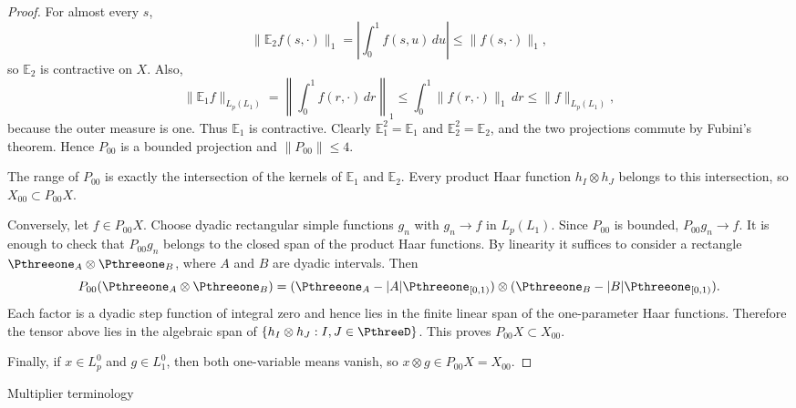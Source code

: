 \documentclass[11pt,reqno]{amsart}
\makeatletter
\theoremstyle{plain}
\theoremstyle{definition}
\newcounter{problempaper}
\newenvironment{problempaperbody}{%
  \setcounter{subsection}{0}%
  \setcounter{subsubsection}{0}%
  \setcounter{paragraph}{0}%
  \renewcommand{\thesubsection}{\arabic{subsection}}%
  \renewcommand{\thesubsubsection}{\thesubsection.\arabic{subsubsection}}%
  \renewcommand{\theparagraph}{\thesubsubsection.\arabic{paragraph}}%
  \let\problem@outersection\section
  \let\problem@outersubsection\subsection
  \let\problem@outersubsubsection\subsubsection
  \let\problem@outerparagraph\paragraph
  \let\section\problem@papersection
  \let\subsection\problem@papersubsection
  \let\subsubsection\problem@papersubsubsection
}{%
  \let\section\problem@outersection
  \let\subsection\problem@outersubsection
  \let\subsubsection\problem@outersubsubsection
  \let\paragraph\problem@outerparagraph
}
\newcommand{\problem@target}[2]{%
  \hypertarget{problem-\theproblempaper-#1-#2}{}%
}
\newcommand{\problem@paperheading}[3]{%
  \par\bigskip
  \problem@target{#1}{#2}%
  \noindent{\large\bfseries #2.\quad #3\par}%
  \nobreak\smallskip
}
\newcommand{\problem@papersubheading}[3]{%
  \par\medskip
  \problem@target{#1}{#2}%
  \noindent{\normalsize\bfseries #2.\quad #3\par}%
  \nobreak\smallskip
}
\newcommand{\problem@papersubsubheading}[3]{%
  \par\smallskip
  \problem@target{#1}{#2}%
  \noindent{\normalsize\itshape #2.\quad #3.\ }%
}
\def\problem@papersection{%
  \@ifstar{\problem@papersectionstar}{\problem@papersectionnostar}%
}
\def\problem@papersectionstar#1{%
  \par\bigskip\noindent{\large\bfseries #1\par}\nobreak\smallskip
}
\def\problem@papersectionnostar#1{%
  \refstepcounter{subsection}%
  \setcounter{subsubsection}{0}%
  \setcounter{paragraph}{0}%
  \problem@paperheading{section}{\thesubsection}{#1}%
  \problem@writecontentsline{section}{\thesubsection}{#1}%
}
\def\problem@papersubsection{%
  \@ifstar{\problem@papersubsectionstar}{\problem@papersubsectionnostar}%
}
\def\problem@papersubsectionstar#1{%
  \par\medskip\noindent{\normalsize\bfseries #1\par}\nobreak\smallskip
}
\def\problem@papersubsectionnostar#1{%
  \refstepcounter{subsubsection}%
  \setcounter{paragraph}{0}%
  \problem@papersubheading{subsection}{\thesubsubsection}{#1}%
  \problem@writecontentsline{subsection}{\thesubsubsection}{#1}%
}
\def\problem@papersubsubsection{%
  \@ifstar{\problem@papersubsubsectionstar}{\problem@papersubsubsectionnostar}%
}
\def\problem@papersubsubsectionstar#1{%
  \par\smallskip\noindent{\normalsize\itshape #1.\ }%
}
\def\problem@papersubsubsectionnostar#1{%
  \refstepcounter{paragraph}%
  \problem@papersubsubheading{subsubsection}{\theparagraph}{#1}%
  \problem@writecontentsline{subsubsection}{\theparagraph}{#1}%
}
\newcommand{\problem@writecontentsline}[3]{%
  \begingroup
  \protected@write\@auxout{}{%
    \string\problemcontentsentry{\theproblempaper}{#1}{#2}{#3}{\thepage}%
  }%
  \endgroup
}
\newcommand{\problemcontentsentry}[5]{%
  \@ifundefined{problemcontents@#1}{%
    \expandafter\gdef\csname problemcontents@#1\endcsname{}%
  }{}%
  \expandafter\g@addto@macro\csname problemcontents@#1\endcsname{%
    \problemcontentsline{#1}{#2}{#3}{#4}{#5}%
  }%
}
\newcommand{\problemcontentslink}[4]{%
  \hyperlink{problem-#1-#2-#3}{#4}%
}
\newcommand{\problemcontentsline}[5]{%
  \ifstrequal{#2}{section}{%
    \par\noindent
    \problemcontentslink{#1}{#2}{#3}{\makebox[2.5em][l]{#3}#4}%
    \nobreak\dotfill
    \problemcontentslink{#1}{#2}{#3}{#5}\par
  }{%
    \ifstrequal{#2}{subsection}{%
      \par\noindent\hspace*{1.5em}%
      \problemcontentslink{#1}{#2}{#3}{\makebox[3.5em][l]{#3}#4}%
      \nobreak\dotfill
      \problemcontentslink{#1}{#2}{#3}{#5}\par
    }{%
      \par\noindent\hspace*{3em}%
      \problemcontentslink{#1}{#2}{#3}{\makebox[4.5em][l]{#3}#4}%
      \nobreak\dotfill
      \problemcontentslink{#1}{#2}{#3}{#5}\par
    }%
  }%
}
\makeatother
\begin{document}
\begin{problempaperbody}
\begin{proof}
For almost every $s$,
\begin{equation*}
        \|\mathbb E_2f(s,\cdot)\|_1
        =\left|\int_0^1 f(s,u)\,du\right|
        \leq \|f(s,\cdot)\|_1,
\end{equation*}
so $\mathbb E_2$ is contractive on $X$.  Also,
\begin{equation*}
        \|\mathbb E_1f\|_{L_p(L_1)}
        =\left\|\int_0^1 f(r,\cdot)\,dr\right\|_1
        \leq\int_0^1\|f(r,\cdot)\|_1\,dr
        \leq\|f\|_{L_p(L_1)},
\end{equation*}
because the outer measure is one.  Thus $\mathbb E_1$ is contractive.  Clearly $\mathbb E_1^2=\mathbb E_1$ and $\mathbb E_2^2=\mathbb E_2$, and the two projections commute by Fubini's theorem. Hence $P_{00}$ is a bounded projection and $\|P_{00}\|\leq4$. 

The range of $P_{00}$ is exactly the intersection of the kernels of $\mathbb E_1$ and $\mathbb E_2$.  Every product Haar function $h_I\otimes h_J$ belongs to this intersection, so $X_{00}\subset P_{00}X$.

Conversely, let $f\in P_{00}X$.  Choose dyadic rectangular simple functions $g_n$ with $g_n\to f$ in $L_p(L_1)$.  Since $P_{00}$ is bounded, $P_{00}g_n\to f$.  It is enough to check that $P_{00}g_n$ belongs to the closed span of the product Haar functions.  By linearity it suffices to consider a rectangle $\Pthreeone_A\otimes\Pthreeone_B$, where $A$ and $B$ are dyadic intervals.  Then
\begin{equation*}
        P_{00}(\Pthreeone_A\otimes\Pthreeone_B)
        =(\Pthreeone_A-|A|\Pthreeone_{[0,1)})
        \otimes
        (\Pthreeone_B-|B|\Pthreeone_{[0,1)}).
\end{equation*}
Each factor is a dyadic step function of integral zero and hence lies in the finite linear span of the one-parameter Haar functions.  Therefore the tensor above lies in the algebraic span of $\{h_I\otimes h_J:I,J\in\PthreeD\}$.  This proves $P_{00}X\subset X_{00}$.

Finally, if $x\in L_p^0$ and $g\in L_1^0$, then both one-variable means vanish, so $x\otimes g\in P_{00}X=X_{00}$.
\end{proof}


\subsection{Multiplier terminology}
\label{p3:sec:multiplier-terminology}


\end{problempaperbody}
\end{document}
